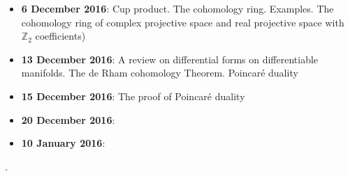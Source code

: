 \documentclass[10pt, twoside=false, x11names]{scrbook}
\newcommand{\Z}{\mathbb{Z}}
\begin{document}
\begin{itemize}
\item \textbf{6 December 2016}: Cup product. The cohomology ring. Examples. The cohomology ring of complex projective space and real projective space with $ \Z_2 $ coefficients)
\item \textbf{13 December 2016}: A review on differential forms on differentiable manifolds. The de Rham cohomology Theorem. Poincaré duality
\item \textbf{15 December 2016}: The proof of Poincaré duality
\item \textbf{20 December 2016}:
\item \textbf{10 January 2016}:
\end{itemize}


\tableofcontents
{}
\printsymblist

                             .




\printindex
\end{document}
